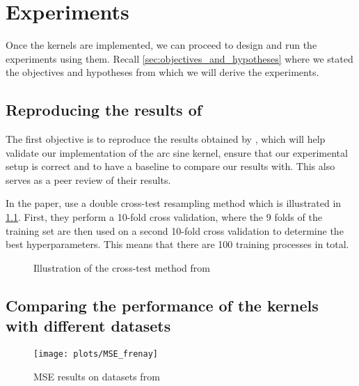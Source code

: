 \chapter{Experiments}
\label{sec:experiments}

Once the kernels are implemented, we can proceed to design and run the experiments using them.
Recall \cref{sec:objectives_and_hypotheses} where we stated the objectives and hypotheses from
which we will derive the experiments.

\section{Reproducing the results of \texorpdfstring{\citeauthor{frenayParameterinsensitiveKernelExtreme2011}}{Frénay and Verleysen}}
\label{sec:reproducing-frenay}

The first objective is to reproduce the results obtained by \textcite{frenayParameterinsensitiveKernelExtreme2011},
which will help validate our implementation of the arc sine kernel, ensure that our experimental setup is
correct and to have a baseline to compare our results with. This also serves as a peer review
of their results.

In the paper, \citeauthor{frenayParameterinsensitiveKernelExtreme2011} use a double cross-test resampling
method which is illustrated in \cref{fig:frenay-cross-test}. First, they perform a 10-fold cross validation,
where the 9 folds of the training set are then used on a second 10-fold cross validation to determine the
best hyperparameters. This means that there are 100 training processes in total.

\begin{figure}[H]
    
	\caption{Illustration of the cross-test method from \cite{frenayParameterinsensitiveKernelExtreme2011}}
	\label{fig:frenay-cross-test}
\end{figure}

\section{Comparing the performance of the kernels with different datasets}%

\begin{figure}
    \texttt{[image: plots/MSE\_frenay]}
    \caption{MSE results on datasets from \cite{frenayParameterinsensitiveKernelExtreme2011}}
\end{figure}

